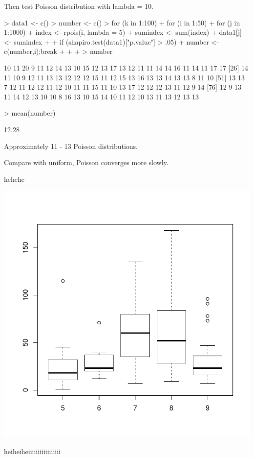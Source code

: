 \documentclass[a4paper]{article}
\begin{document}
Then test Poisson distribution with lambda = 10.
\begin{Schunk}
\begin{Sinput}
> data1 <- c()
> number <- c()
> for (k in 1:100) {
+   for (i in 1:50) {
+     for (j in 1:1000) {
+       index <- rpois(i, lambda = 5)
+       sumindex <- sum(index)
+       data1[j] <- sumindex
+     }
+     if (shapiro.test(data1)["p.value"] > .05) {
+       number <- c(number,i);break
+     }
+   }
+ }
> number
\end{Sinput}
\begin{Soutput}
  [1] 10 11 20  9 11 12 14 13 10 15 12 13 17 13 12 11 11 14 14 16 11 14 11 17 17
 [26] 14 11 10  9 12 11 13 13 12 12 12 15 11 12 15 13 16 13 13 14 13 13  8 11 10
 [51] 13 13  7 12 11 12 12 11 12 10 11 11 15 11 10 13 17 12 12 12 13 11 12  9 14
 [76] 12  9 13 11 14 12 13 10 10  8 16 13 10 15 14 10 11 12 10 13 11 13 12 13 13
\end{Soutput}
\begin{Sinput}
> mean(number)
\end{Sinput}
\begin{Soutput}
[1] 12.28
\end{Soutput}
\end{Schunk}
Approximately 11 - 13 Poisson distributions.

Compare with uniform, Poisson converges more slowly.
















hehehe

\begin{center}
\includegraphics{Assignment_4-004}

heiheiheiiiiiiiiiiiiiiiii
\end{center}
\end{document}
